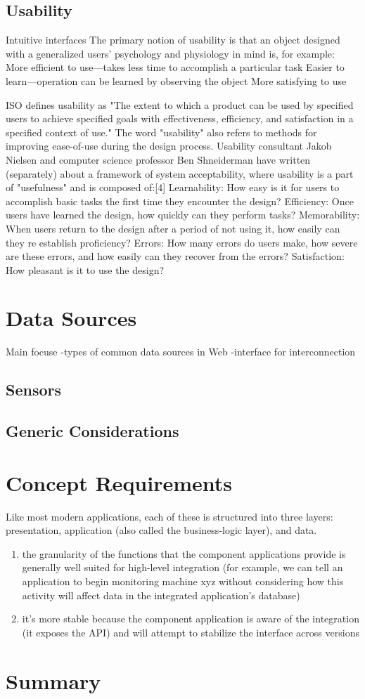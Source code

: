\subsection {Usability} Intuitive interfaces
The primary notion of usability is that an object designed with a generalized users' psychology and physiology in mind is, for example:
More efficient to use—takes less time to accomplish a particular task
Easier to learn—operation can be learned by observing the object
More satisfying to use

ISO defines usability as "The extent to which a product can be used by specified users to achieve specified goals with effectiveness, efficiency, and satisfaction in a specified context of use." The word "usability" also refers to methods for improving ease-of-use during the design process. Usability consultant Jakob Nielsen and computer science professor Ben Shneiderman have written (separately) about a framework of system acceptability, where usability is a part of "usefulness" and is composed of:[4]
Learnability: How easy is it for users to accomplish basic tasks the first time they encounter the design?
Efficiency: Once users have learned the design, how quickly can they perform tasks?
Memorability: When users return to the design after a period of not using it, how easily can they re establish proficiency?
Errors: How many errors do users make, how severe are these errors, and how easily can they recover from the errors?
Satisfaction: How pleasant is it to use the design?
\section {Data Sources}
Main focuse 
-types of common data sources in Web
\newline
-interface for interconnection
\subsection {Sensors}

\subsection {Generic Considerations}

\section{Concept Requirements}
Like most modern applications, each of these is structured into three layers: presentation, 
application (also called the business-logic layer), and data.
\begin{enumerate}
\item the granularity of the functions that the component applications provide is generally well
suited for high-level integration (for example, we can tell an application to begin monitoring
machine xyz without considering how this activity will affect data in the integrated application’s database)
\item it’s more stable because the component application is aware of the integration (it exposes
the API) and will attempt to stabilize the interface across versions
\end{enumerate}

\section{Summary}